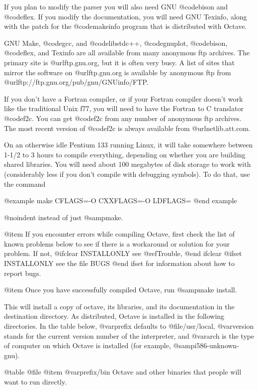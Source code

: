 If you plan to modify the parser you will also need GNU @code{bison} and
@code{flex}.  If you modify the documentation, you will need GNU
Texinfo, along with the patch for the @code{makeinfo} program that is
distributed with Octave.

GNU Make, @code{gcc}, and @code{libstdc++}, @code{gnuplot},
@code{bison}, @code{flex}, and Texinfo are all available from many
anonymous ftp archives.  The primary site is @url{ftp.gnu.org}, but it
is often very busy.  A list of sites that mirror the software on
@url{ftp.gnu.org} is available by anonymous ftp from
@url{ftp://ftp.gnu.org/pub/gnu/GNUinfo/FTP}.

If you don't have a Fortran compiler, or if your Fortran compiler
doesn't work like the traditional Unix f77, you will need to have the
Fortran to C translator @code{f2c}.  You can get @code{f2c} from any
number of anonymous ftp archives.  The most recent version of @code{f2c}
is always available from @url{netlib.att.com}.

On an otherwise idle Pentium 133 running Linux, it will take somewhere
between 1-1/2 to 3 hours to compile everything, depending on whether you
are building shared libraries.  You will need about 100 megabytes of disk
storage to work with (considerably less if you don't compile with debugging
symbols).  To do that, use the command

@example
make CFLAGS=-O CXXFLAGS=-O LDFLAGS=
@end example

@noindent
instead of just @samp{make}.

@item
If you encounter errors while compiling Octave, first check the list of
known problems below to see if there is a workaround or solution for
your problem.  If not,
@ifclear INSTALLONLY
see @ref{Trouble},
@end ifclear
@ifset INSTALLONLY
see the file BUGS
@end ifset
for information about how to report bugs.

@item
Once you have successfully compiled Octave, run @samp{make install}.

This will install a copy of octave, its libraries, and its documentation
in the destination directory.  As distributed, Octave is installed in
the following directories.  In the table below, @var{prefix} defaults to
@file{/usr/local}, @var{version} stands for the current version number
of the interpreter, and @var{arch} is the type of computer on which
Octave is installed (for example, @samp{i586-unknown-gnu}).

@table @file
@item @var{prefix}/bin
Octave and other binaries that people will want to run directly.

